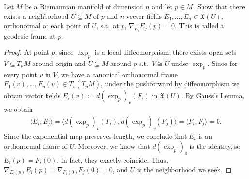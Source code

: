 \documentclass[12pt]{article}
\begin{document}
\begin{problem}[do Carmo 3.7]
Let $ M$ be a Riemannian manifold of dimension $ n$ and let  $ p \in M$. Show that there exists a neighborhood $ U \subseteq M$ of $ p$ and  $ n$ vector fields  $ E_1,\ldots,E_n \in \mathfrak{ X} (U) $, orthonormal at each point of $ U$,  s.t.\ at $ p$,  $ \nabla _{E_i} E_j(p) =0$. This is called a geodesic frame at $ p$.
\end{problem}
\begin{proof}
	At point $ p$, since  $ \exp_p$ is a local diffeomorphism, there exists open sets $ V \subseteq T_pM$ around origin and $ U \subseteq M$ around $ p$ s.t.\ $ V \cong U$ under $ \exp_p$. Since for every point $ v$ in $ V$, we have a canonical orthonormal frame $ F_1(v), \ldots , F_n(v) \in T_v(T_pM)$, under the pushforward by diffeomorphism we obtain vector fields $ E_i(u) := d (\exp_p)_v(F_i)$ in $ \mathfrak{X}(U)$. By Gauss's Lemma, we obtain
\begin{align*}
	\langle E_i, E_j \rangle = \langle d(\exp_p)_v(F_i), d(\exp_p)_v(F_j)  \rangle = \langle F_i , F_j \rangle = 0 . 
\end{align*}
Since the exponential map preserves length, we conclude that $ E_i$ is an orthonormal frame of $ U$. Moreover, we know that  $ d(\exp_p)_0 $ is the identity, so $ E_i(p) = F_i(0)$. In fact, they exactly coincide. Thus, $ \nabla _{E_i(p)} E_j (p)  = \nabla _{F_i(0)} F_j(0) =0$, and $ U$ is the neighborhood we seek.
\end{proof}
\end{document}
